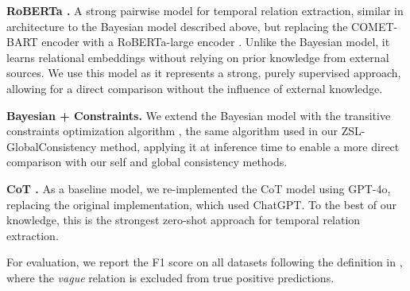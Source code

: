 \textbf{RoBERTa \cite{tan-etal-2023-event}.} A strong pairwise model for temporal relation extraction, similar in architecture to the Bayesian model described above, but replacing the COMET-BART encoder with a RoBERTa-large encoder \cite{zhuang-etal-2021-robustly}. Unlike the Bayesian model, it learns relational embeddings without relying on prior knowledge from external sources. We use this model as it represents a strong, purely supervised approach, allowing for a direct comparison without the influence of external knowledge.



\textbf{Bayesian + Constraints.}  
We extend the Bayesian model with the transitive constraints optimization algorithm \cite{ning-etal-2018-joint}, the same algorithm used in our ZSL-GlobalConsistency method, applying it at inference time to enable a more direct comparison with our self and global consistency methods.




\textbf{CoT \cite{yuan-etal-2023-zero}.} 
As a baseline model, we re-implemented the CoT model \cite{yuan-etal-2023-zero} using GPT-4o, replacing the original implementation, which used ChatGPT. To the best of our knowledge, this is the strongest zero-shot approach for temporal relation extraction.

For evaluation, we report the F1 score on all datasets following the definition in \cite{ning-etal-2019-improved}, where the \textit{vague} relation is excluded from true positive predictions. 









